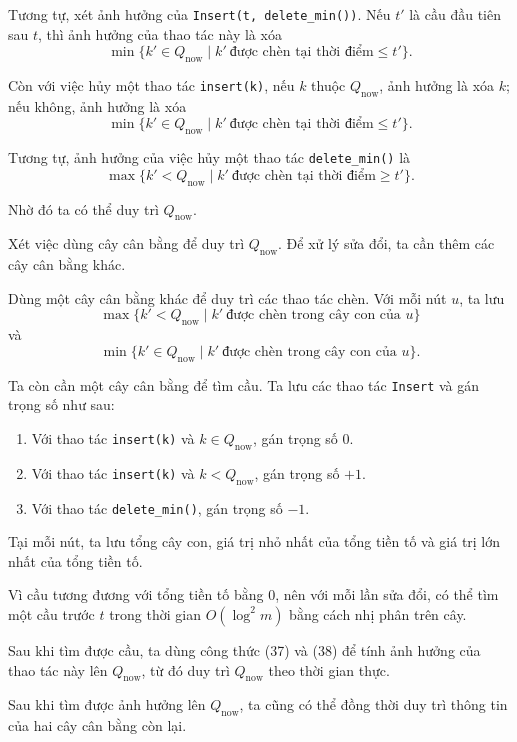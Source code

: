 \documentclass[11pt]{article}
\begin{document}
Tương tự, xét ảnh hưởng của \texttt{Insert(t, delete\_min())}. Nếu \(t'\) là
cầu đầu tiên sau \(t\), thì ảnh hưởng của thao tác này là xóa
\[
\min\{k'\in Q_{\mathrm{now}} \mid k'\ \text{được chèn tại thời điểm}\le t'\}.
\tag{38}
\]

Còn với việc hủy một thao tác \texttt{insert(k)}, nếu \(k\) thuộc
\(Q_{\mathrm{now}}\), ảnh hưởng là xóa \(k\); nếu không, ảnh hưởng là xóa
\[
\min\{k'\in Q_{\mathrm{now}} \mid k'\ \text{được chèn tại thời điểm}\le t'\}.
\]

Tương tự, ảnh hưởng của việc hủy một thao tác \texttt{delete\_min()} là
\[
\max\{k'<Q_{\mathrm{now}} \mid k'\ \text{được chèn tại thời điểm}\ge t'\}.
\]

Nhờ đó ta có thể duy trì \(Q_{\mathrm{now}}\).

Xét việc dùng cây cân bằng để duy trì \(Q_{\mathrm{now}}\). Để xử lý sửa đổi,
ta cần thêm các cây cân bằng khác.

Dùng một cây cân bằng khác để duy trì các thao tác chèn. Với mỗi nút \(u\), ta
lưu
\[
\max\{k'<Q_{\mathrm{now}} \mid k'\ \text{được chèn trong cây con của }u\}
\]
và
\[
\min\{k'\in Q_{\mathrm{now}} \mid k'\ \text{được chèn trong cây con của }u\}.
\]

Ta còn cần một cây cân bằng để tìm cầu. Ta lưu các thao tác \texttt{Insert} và
gán trọng số như sau:

\begin{enumerate}
  \item Với thao tác \texttt{insert(k)} và \(k\in Q_{\mathrm{now}}\), gán
        trọng số \(0\).
  \item Với thao tác \texttt{insert(k)} và \(k<Q_{\mathrm{now}}\), gán trọng
        số \(+1\).
  \item Với thao tác \texttt{delete\_min()}, gán trọng số \(-1\).
\end{enumerate}

Tại mỗi nút, ta lưu tổng cây con, giá trị nhỏ nhất của tổng tiền tố và giá trị
lớn nhất của tổng tiền tố.

Vì cầu tương đương với tổng tiền tố bằng \(0\), nên với mỗi lần sửa đổi, có
thể tìm một cầu trước \(t\) trong thời gian \(O(\log^2 m)\) bằng cách nhị phân
trên cây.

Sau khi tìm được cầu, ta dùng công thức (37) và (38) để tính ảnh hưởng của
thao tác này lên \(Q_{\mathrm{now}}\), từ đó duy trì \(Q_{\mathrm{now}}\) theo
thời gian thực.

Sau khi tìm được ảnh hưởng lên \(Q_{\mathrm{now}}\), ta cũng có thể đồng thời
duy trì thông tin của hai cây cân bằng còn lại.
\end{document}
